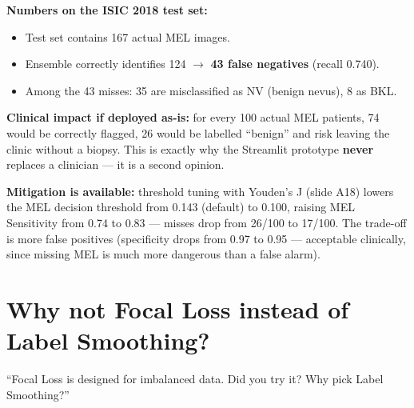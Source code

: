 \documentclass[11pt,a4paper]{article}
\begin{document}
\begin{answer}
\textbf{Numbers on the ISIC 2018 test set:}
\begin{itemize}[leftmargin=*]
  \item Test set contains 167 actual MEL images.
  \item Ensemble correctly identifies 124 $\to$ \textbf{43 false negatives} (recall 0.740).
  \item Among the 43 misses: 35 are misclassified as NV (benign nevus), 8 as BKL.
\end{itemize}

\textbf{Clinical impact if deployed as-is:} for every 100 actual MEL patients, 74 would be correctly flagged, 26 would be labelled ``benign'' and risk leaving the clinic without a biopsy. This is exactly why the Streamlit prototype \textbf{never} replaces a clinician --- it is a second opinion.

\textbf{Mitigation is available:} threshold tuning with Youden's J (slide A18) lowers the MEL decision threshold from 0.143 (default) to 0.100, raising MEL Sensitivity from 0.74 to 0.83 --- misses drop from 26/100 to 17/100. The trade-off is more false positives (specificity drops from 0.97 to 0.95 --- acceptable clinically, since missing MEL is much more dangerous than a false alarm).
\end{answer}

\section{Why not Focal Loss instead of Label Smoothing?}

\begin{question}
``Focal Loss is designed for imbalanced data. Did you try it? Why pick Label Smoothing?''
\end{question}
\end{document}
